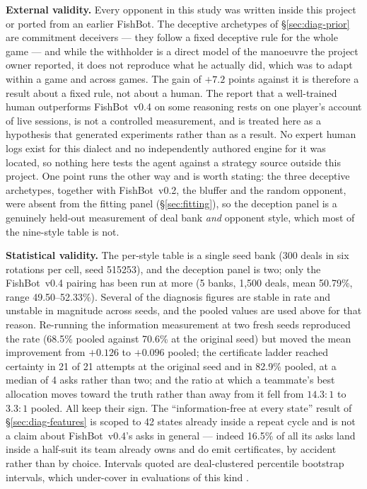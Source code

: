 \documentclass[11pt]{article}
\theoremstyle{definition}
\DeclareRobustCommand{\vfour}{\texorpdfstring{\mbox{FishBot v0.4}}{FishBot v0.4}}
\DeclareRobustCommand{\vtwo}{\texorpdfstring{\mbox{FishBot v0.2}}{FishBot v0.2}}
\providecommand{\numOwnLocked}{16.5}
\providecommand{\numCertRate}{68.5}
\providecommand{\numCertMean}{0.096}
\providecommand{\numLadderRate}{82.9}
\providecommand{\numLadderMedian}{4}
\providecommand{\numInfoFreeStates}{42}
\providecommand{\numCertRateOrig}{70.6}
\providecommand{\numCertMeanOrig}{0.126}
\providecommand{\numLadderOrigN}{21}
\providecommand{\numMapRatioOrig}{14.3}
\providecommand{\numMapRatioPooled}{3.3}
\providecommand{\numHeadWin}{50.79}
\providecommand{\numHeadRange}{49.50--52.33}
\providecommand{\numHeadSeeds}{5}
\providecommand{\numHeadDeals}{1{,}500}
\providecommand{\numStyleDeals}{300}
\providecommand{\numStyleSeed}{515253}
\providecommand{\numDecWithholderDelta}{+7.2}
\begin{document}
\textbf{External validity.} Every opponent in this study was written inside this
project or ported from an earlier FishBot. The deceptive archetypes of
\S\ref{sec:diag-prior} are commitment deceivers --- they follow a fixed deceptive
rule for the whole game --- and while the withholder is a direct model of the
manoeuvre the project owner reported, it does not reproduce what he actually
did, which was to adapt within a game and across games. The gain of
$\numDecWithholderDelta$ points against it is therefore a result about a fixed
rule, not about a human. The report that a well-trained human outperforms
\vfour{} on some reasoning rests on one player's account of live sessions, is not
a controlled measurement, and is treated here as a hypothesis that generated
experiments rather than as a result. No expert human logs exist for this dialect
and no independently authored engine for it was located, so nothing here tests
the agent against a strategy source outside this project. One point runs the
other way and is worth stating: the three deceptive archetypes, together with
\vtwo{}, the bluffer and the random opponent, were absent from the fitting panel
(\S\ref{sec:fitting}), so the deception panel is a genuinely held-out
measurement of deal bank \emph{and} opponent style, which most of the nine-style
table is not.

\textbf{Statistical validity.} The per-style table is a single seed bank
(\numStyleDeals{} deals in six rotations per cell, seed \numStyleSeed{}), and the
deception panel is two; only the \vfour{} pairing has been run at more
(\numHeadSeeds{} banks, \numHeadDeals{} deals, mean \numHeadWin\%, range
\numHeadRange\%). Several of the diagnosis figures are stable in rate and
unstable in magnitude across seeds, and the pooled values are used above for that
reason. Re-running the information measurement at two fresh seeds reproduced the
rate (\numCertRate\% pooled against \numCertRateOrig\% at the original seed) but
moved the mean improvement from $+\numCertMeanOrig$ to $+\numCertMean$ pooled;
the certificate ladder reached certainty in \numLadderOrigN{} of
\numLadderOrigN{} attempts at the original seed and in \numLadderRate\% pooled,
at a median of \numLadderMedian{} asks rather than two; and the ratio at which a
teammate's best allocation moves toward the truth rather than away from it fell
from $\numMapRatioOrig\!:\!1$ to $\numMapRatioPooled\!:\!1$ pooled. All keep
their sign. The ``information-free at every state'' result of
\S\ref{sec:diag-features} is scoped to \numInfoFreeStates{} states already inside
a repeat cycle and is not a claim about \vfour{}'s asks in general --- indeed
\numOwnLocked\% of all its asks land inside a half-suit its team already owns and
do emit certificates, by accident rather than by choice. Intervals quoted are
deal-clustered percentile bootstrap intervals, which under-cover in evaluations
of this kind \cite{jordan-rleval}.
\end{document}
